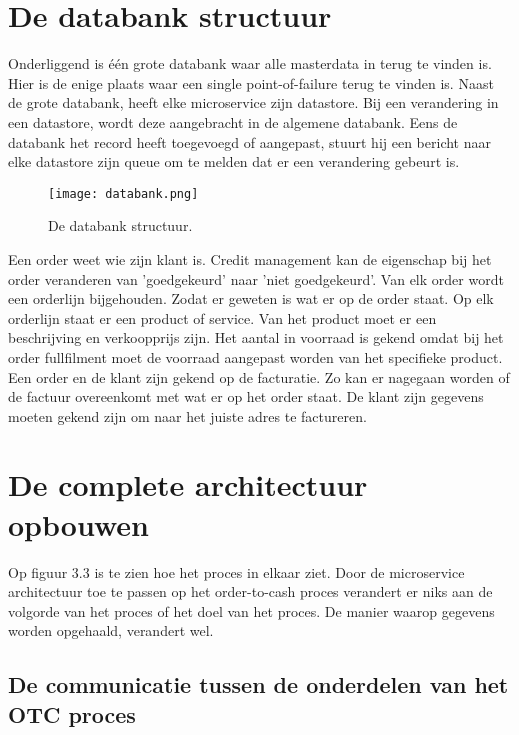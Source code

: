 \section{De databank structuur}
Onderliggend is één grote databank waar alle masterdata in terug te vinden is. Hier is de enige plaats waar een single point-of-failure terug te vinden is. Naast de grote databank, heeft elke microservice zijn datastore. Bij een verandering in een datastore, wordt deze aangebracht in de algemene databank. Eens de databank het record heeft toegevoegd of aangepast, stuurt hij een bericht naar elke datastore zijn queue om te melden dat er een verandering gebeurt is. 
\begin{figure}[h]
	\texttt{[image: databank.png]}
	\caption{De databank structuur.}
	\centering
\end{figure}

Een order weet wie zijn klant is. Credit management kan de eigenschap bij het order veranderen van 'goedgekeurd' naar 'niet goedgekeurd'. Van elk order wordt een orderlijn bijgehouden. Zodat er geweten is wat er op de order staat. Op elk orderlijn staat er een product of service. Van het product moet er een beschrijving en verkoopprijs zijn. Het aantal in voorraad is gekend omdat bij het order fullfilment moet de voorraad aangepast worden van het specifieke product. Een order en de klant zijn gekend op de facturatie. Zo kan er nagegaan worden of de factuur overeenkomt met wat er op het order staat. De klant zijn gegevens moeten gekend zijn om naar het juiste adres te factureren.

\section{De complete architectuur opbouwen}
Op figuur 3.3 is te zien hoe het proces in elkaar ziet. Door de microservice architectuur toe te passen op het order-to-cash proces verandert er niks aan de volgorde van het proces of het doel van het proces. De manier waarop gegevens worden opgehaald, verandert wel. 

\subsection{De communicatie tussen de onderdelen van het OTC proces}

